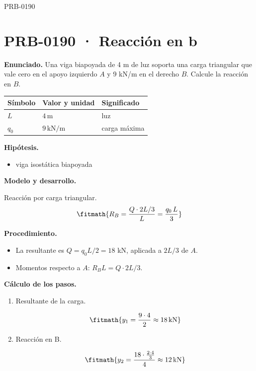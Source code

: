 \begin{studiumworked}{PRB-0190}

\section{PRB-0190 · Reacción en b}

\textbf{Enunciado.} Una viga biapoyada de 4 m de luz soporta una carga triangular que vale cero en el apoyo izquierdo $A$ y 9 kN/m en el derecho $B$. Calcule la reacción en $B$.

\par\medskip\noindent\begin{tabular}{@{}p{.18\linewidth}p{.26\linewidth}p{.48\linewidth}@{}}
\toprule Símbolo & Valor y unidad & Significado\\\midrule
$L$ & $4\,\mathrm{m}$ & luz\\
$q_{0}$ & $9\,\mathrm{kN/m}$ & carga máxima\\
\bottomrule\end{tabular}\par\medskip

\textbf{Hipótesis.}\begin{itemize}\item viga isostática biapoyada\end{itemize}

\textbf{Modelo y desarrollo.}

Reacción por carga triangular.\[\fitmath{R_B = \frac{Q\cdot 2L/3}{L} = \frac{q_0\,L}{3}}\]

\textbf{Procedimiento.}\begin{itemize}\item La resultante es $Q = q_0 L/2 = 18$ kN, aplicada a $2L/3$ de $A$.
\item Momentos respecto a $A$: $R_B L = Q\cdot 2L/3$.\end{itemize}

\textbf{Cálculo de los pasos.}

\begin{enumerate}

\item Resultante de la carga.

\[\fitmath{y_{1}=\frac{9\cdot 4}{2}\approx 18\,\mathrm{kN}}\]

\item Reacción en B.

\[\fitmath{y_{2}=\frac{18\cdot \frac{2\cdot 4}{3}}{4}\approx 12\,\mathrm{kN}}\]

\end{enumerate}


\end{studiumworked}

